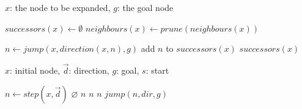 \begin{algorithm}[b]
\caption{$generateSuccessors$}
\label{alg:successors}
\begin{algorithmic}[1]
\REQUIRE $x$: the node to be expanded, $g$: the goal node 

\STATE $successors(x) \leftarrow \emptyset$
\STATE $neighbours(x) \leftarrow prune(neighbours(x))$

\STATE $n \leftarrow jump(x, direction(x, n), g)$
\STATE add $n$ to $successors(x)$
\ENDFOR
\RETURN $successors(x)$

\end{algorithmic}
\end{algorithm}

\begin{algorithm}[b]
\caption{$jump$}
\label{alg:jump}
\begin{algorithmic}[1]
\REQUIRE $x$: initial node, $\vec{d}$: direction, $g$: goal, $s$: start

\STATE $n \leftarrow step(x, \vec{d})$
	\RETURN $\varnothing$
\ENDIF
{}
	\RETURN $n$
\ENDIF
{}
	\RETURN $n$
\ENDIF
{}
			\RETURN $n$
		\ENDIF
	\ENDFOR
\ENDIF
\RETURN $jump(n, dir, g)$
\end{algorithmic}
\end{algorithm}
